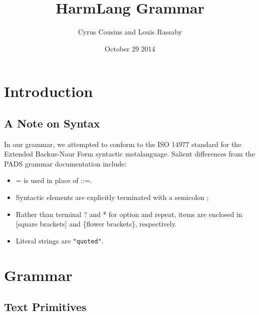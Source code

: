 \documentclass{article}
\title{HarmLang Grammar}
\author{Cyrus Cousins and Louis Rassaby}
\date{October 29 2014}
\begin{document}
\maketitle

\tableofcontents


\section{Introduction}

\subsection{A Note on Syntax}

In our grammar, we attempted to conform to the ISO 14977 standard for the Extended Backus-Naur Form syntactic metalanguage.  Salient differences from the PADS grammar documentation include:

\begin{itemize}
\item = is used in place of ::=.
\item Syntactic elements are explicitly terminated with a semicolon ;
\item Rather than terminal ? and * for option and repeat, items are enclosed in [square brackets] and \{flower brackets\}, respectively.
\item Literal strings are \texttt{"quoted"}.
\end{itemize}

\section{Grammar}
\subsection{Text Primitives}

\end{document}
